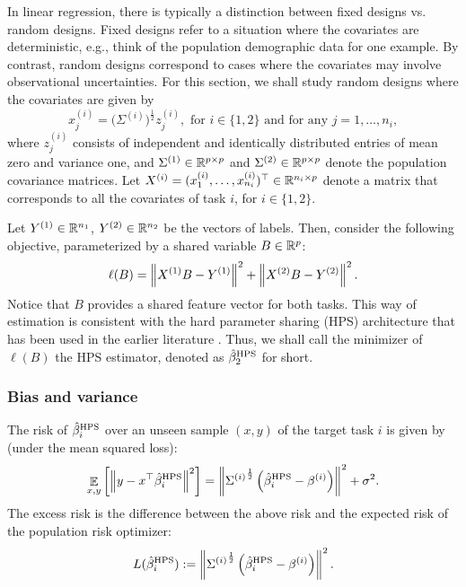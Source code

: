 In linear regression, there is typically a distinction between fixed designs vs. random designs.
Fixed designs refer to a situation where the covariates are deterministic, e.g., think of the population demographic data for one example.
By contrast, random designs correspond to cases where the covariates may involve observational uncertainties.
For this section, we shall study random designs where the covariates are given by
\[ x_j^{(i)} = \big(\Sigma^{(i)}\big)^{\frac 1 2} z_{j}^{(i)}, \text{ for } i\in\{1,2\} \text{ and for any } j = 1,\dots,n_i, \]
where $z_j^{(i)}$ consists of independent and identically distributed entries of mean zero and variance one, and $\Sigma^{(1)} \in \mathbb{R}^{p \times p}$ and $\Sigma^{(2)} \in \mathbb{R}^{p \times p}$ denote the population covariance matrices.
Let $X^{(i)}=(x_1^{(i)},\ldots,x_{n_i}^{(i)})^\top \in\mathbb{R}^{n_i \times p}$ denote a matrix that corresponds to all the covariates of task $i$, for $i \in \{1, 2\}$.

Let $Y^{(1)}\in \mathbb{R}^{n_1}$, $Y^{(2)}\in \mathbb{R}^{n_2}$ be the vectors of labels.
Then, consider the following objective, parameterized by a shared variable $B \in \mathbb{R}^{p}$:
\begin{align}\label{eq_hps}
    \ell(B) = \left\| X^{(1)} B - Y^{(1)} \right\|^2 + \left\| X^{(2)} B - Y^{(2)} \right\|^2.
\end{align}
Notice that $B$ provides a shared feature vector for both tasks.
This way of estimation is consistent with the hard parameter sharing (HPS) architecture that has been used in the earlier literature \citep{caruana1997multitask}.
Thus, we shall call the minimizer of $\ell(B)$ the HPS estimator, denoted as $\hat\beta_2^{\textup{HPS}}$ for short.

\subsubsection{Bias and variance}

The risk of $\hat{\beta}_i^{\textup{HPS}}$ over an unseen sample $(x,y)$ of the target task $i$ is
given by (under the mean squared loss):
$$\mathop{\mathbb{E}}_{x, y}\left[ \left\|y-x^\top \hat{\beta}_i^{\textup{HPS}} \right\|^2 \right]= \left\|{\Sigma^{(i)}}^{\frac 1 2} \left(\hat{\beta}_i^{\textup{HPS}} - \beta^{(i)}\right)\right\|^2 + \sigma^2.$$
The excess risk is the difference between the above risk and the expected risk of the population risk optimizer:
\begin{align}\label{HPS_loss}
    L(\hat{\beta}_i^{\textup{HPS}}) := \left\| {\Sigma^{(i)}}^{\frac 1 2} \left(\hat{\beta}_i^{\textup{HPS}} - \beta^{(i)}\right)\right\|^2.
\end{align}


